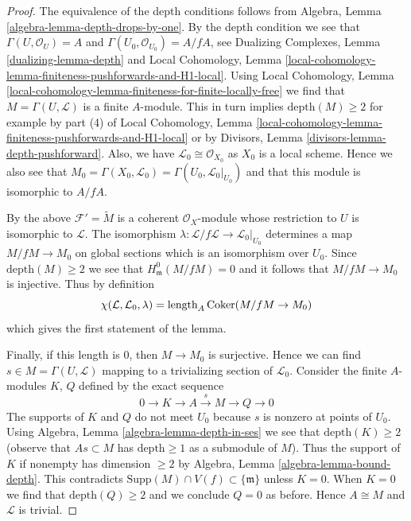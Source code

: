 \begin{proof}
The equivalence of the depth conditions follows from
Algebra, Lemma \ref{algebra-lemma-depth-drops-by-one}.
By the depth condition we see that
$\Gamma(U, \mathcal{O}_U) = A$ and
$\Gamma(U_0, \mathcal{O}_{U_0}) = A/fA$, see
Dualizing Complexes, Lemma \ref{dualizing-lemma-depth} and
Local Cohomology, Lemma
\ref{local-cohomology-lemma-finiteness-pushforwards-and-H1-local}.
Using Local Cohomology, Lemma
\ref{local-cohomology-lemma-finiteness-for-finite-locally-free}
we find that $M = \Gamma(U, \mathcal{L})$ is a finite $A$-module.
This in turn implies $\text{depth}(M) \geq 2$ for example by
part (4) of Local Cohomology, Lemma
\ref{local-cohomology-lemma-finiteness-pushforwards-and-H1-local}
or by Divisors, Lemma \ref{divisors-lemma-depth-pushforward}.
Also, we have $\mathcal{L}_0 \cong \mathcal{O}_{X_0}$
as $X_0$ is a local scheme. Hence we also see that
$M_0 = \Gamma(X_0, \mathcal{L}_0) = \Gamma(U_0, \mathcal{L}_0|_{U_0})$
and that this module is isomorphic to $A/fA$.

\medskip\noindent
By the above $\mathcal{F}' = \widetilde{M}$ is a coherent
$\mathcal{O}_X$-module whose restriction to $U$ is isomorphic to $\mathcal{L}$.
The isomorphism $\lambda : \mathcal{L}/f\mathcal{L} \to \mathcal{L}_0|_{U_0}$
determines a map $M/fM \to M_0$ on global sections
which is an isomorphism over $U_0$.
Since $\text{depth}(M) \geq 2$ we see
that $H^0_\mathfrak m(M/fM) = 0$ and it follows that
$M/fM \to M_0$ is injective. Thus by definition
$$
\chi(\mathcal{L}, \mathcal{L}_0, \lambda) =
\text{length}_A \mathop{\mathrm{Coker}}(M/fM \to M_0)
$$
which gives the first statement of the lemma.

\medskip\noindent
Finally, if this length is $0$, then $M \to M_0$ is surjective.
Hence we can find $s \in M = \Gamma(U, \mathcal{L})$
mapping to a trivializing section of $\mathcal{L}_0$.
Consider the finite $A$-modules $K$, $Q$ defined by the exact
sequence
$$
0 \to K \to A \xrightarrow{s} M \to Q \to 0
$$
The supports of $K$ and $Q$ do not meet $U_0$ because $s$
is nonzero at points of $U_0$. Using
Algebra, Lemma \ref{algebra-lemma-depth-in-ses}
we see that $\text{depth}(K) \geq 2$ (observe that
$As \subset M$ has $\text{depth} \geq 1$ as a submodule of $M$).
Thus the support of $K$ if nonempty has dimension $\geq 2$ by
Algebra, Lemma \ref{algebra-lemma-bound-depth}.
This contradicts $\text{Supp}(M) \cap V(f) \subset \{\mathfrak m\}$
unless $K = 0$. When $K = 0$ we find that
$\text{depth}(Q) \geq 2$ and we conclude
$Q = 0$ as before. Hence $A \cong M$ and
$\mathcal{L}$ is trivial.
\end{proof}







